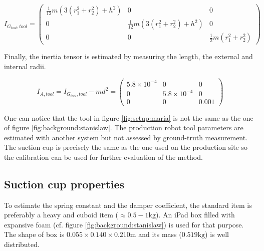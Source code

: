 \documentclass[/home/francois/latex/report/main.tex]{subfiles}
\begin{document}
\begin{equation}
  \label{eq:setup:tensor}
  I_{G_{tool}, tool} =
  \begin{pmatrix}
  \frac{1}{12} m(3(r_1^2+r_2^2) + h^2) & 0 & 0  \\
  0 & \frac{1}{12} m(3(r_1^2+r_2^2) + h^2) & 0 \\
  0 & 0 & \frac{1}{2} m(r_1^2+r_2^2)
  \end{pmatrix}
\end{equation}

Finally, the inertia tensor is estimated by measuring the length, the external and internal radii.

\begin{equation*}
  I_{A, tool} = I_{G_{tool}, tool} - m d^2 =
  \begin{pmatrix}
  5.8 \times 10^{-4} & 0 & 0  \\
  0 & 5.8 \times 10^{-4} & 0 \\
  0 & 0 & 0.001
  \end{pmatrix}
\end{equation*}

One can notice that the tool in figure \ref{fig:setup:maria} is not the same as the one of figure \ref{fig:background:stanislaw}. The production robot tool parameters are estimated with another system but not assessed by ground-truth measurement. The suction cup is precisely the same as the one used on the production site so the calibration can be used for further evaluation of the method.

\subsection{Suction cup properties}

To estimate the spring constant and the damper coefficient, the standard item is preferably a heavy and cuboid item ($\approx 0.5-1 \si{\kilogram}$). An iPad box filled with expansive foam (cf. figure \ref{fig:background:stanislaw}) is used for that purpose. The shape of box is $0.055 \times 0.140 \times 0.210 \si{\meter}$ and its mass ($0.519 \si{\kilogram}$) is well distributed.
\end{document}
